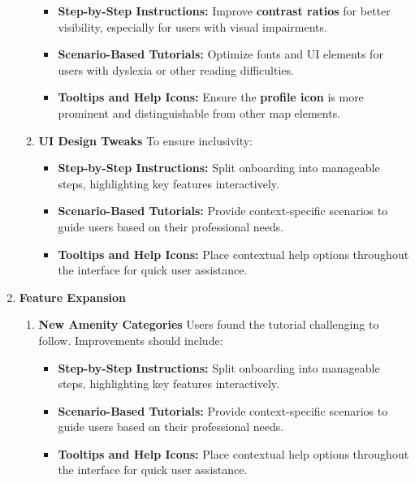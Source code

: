\begin{enumerate}
\begin{enumerate}
        \begin{itemize}
            \item \textbf{Step-by-Step Instructions:} Improve \textbf{contrast ratios} for better visibility, especially for users with visual impairments.
            \item \textbf{Scenario-Based Tutorials:} Optimize fonts and UI elements for users with dyslexia or other reading difficulties.
            \item \textbf{Tooltips and Help Icons:} Ensure the \textbf{profile icon} is more prominent and distinguishable from other map elements.
        \end{itemize}
        \item \textbf{UI Design Tweaks}
        To ensure inclusivity:
        \begin{itemize}
            \item \textbf{Step-by-Step Instructions:} Split onboarding into manageable steps, highlighting key features interactively.
            \item \textbf{Scenario-Based Tutorials:} Provide context-specific scenarios to guide users based on their professional needs.
            \item \textbf{Tooltips and Help Icons:} Place contextual help options throughout the interface for quick user assistance.
        \end{itemize}
    \end{enumerate}
    
    \item \textbf{Feature Expansion}
    \begin{enumerate}
        \item \textbf{New Amenity Categories}
        Users found the tutorial challenging to follow. Improvements should include:
        \begin{itemize}
            \item \textbf{Step-by-Step Instructions:} Split onboarding into manageable steps, highlighting key features interactively.
            \item \textbf{Scenario-Based Tutorials:} Provide context-specific scenarios to guide users based on their professional needs.
            \item \textbf{Tooltips and Help Icons:} Place contextual help options throughout the interface for quick user assistance.
        \end{itemize}
    \end{enumerate}

\end{enumerate}